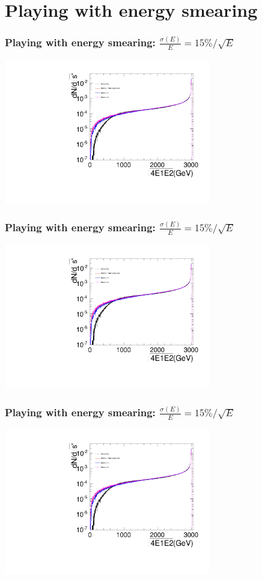\documentclass{beamer}
\begin{document}
\section{Playing with energy smearing}
\begin{frame}
\frametitle{Playing with energy smearing: $\frac{\sigma(E)}{E}=15\%/\sqrt{E}$}
\centering
\includegraphics[width=9cm,page=1]{./Spectra_BHWide_Esmeared15.pdf}
\end{frame}
\begin{frame}
\frametitle{Playing with energy smearing: $\frac{\sigma(E)}{E}=15\%/\sqrt{E}$}
\centering
\includegraphics[width=9cm,page=2]{./Spectra_BHWide_Esmeared15.pdf}
\end{frame}
\begin{frame}
\frametitle{Playing with energy smearing: $\frac{\sigma(E)}{E}=15\%/\sqrt{E}$}
\centering
\includegraphics[width=9cm,page=4]{./Spectra_BHWide_Esmeared15.pdf}
\end{frame}
\end{document}
